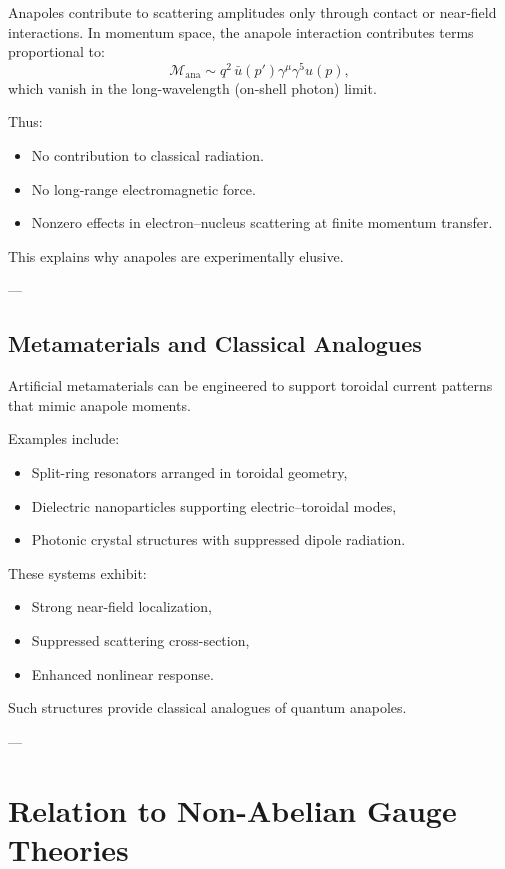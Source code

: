 \documentclass[11pt]{article}
\begin{document}
Anapoles contribute to scattering amplitudes only through contact or near-field interactions.  
In momentum space, the anapole interaction contributes terms proportional to:
\[
\mathcal{M}_{\text{ana}} \sim q^2 \, \bar{u}(p') \gamma^\mu \gamma^5 u(p),
\]
which vanish in the long-wavelength (on-shell photon) limit.

Thus:
\begin{itemize}
\item No contribution to classical radiation.
\item No long-range electromagnetic force.
\item Nonzero effects in electron–nucleus scattering at finite momentum transfer.
\end{itemize}

This explains why anapoles are experimentally elusive.

---

\subsection{Metamaterials and Classical Analogues}

Artificial metamaterials can be engineered to support toroidal current patterns that mimic anapole moments.

Examples include:
\begin{itemize}
\item Split-ring resonators arranged in toroidal geometry,
\item Dielectric nanoparticles supporting electric–toroidal modes,
\item Photonic crystal structures with suppressed dipole radiation.
\end{itemize}

These systems exhibit:
\begin{itemize}
\item Strong near-field localization,
\item Suppressed scattering cross-section,
\item Enhanced nonlinear response.
\end{itemize}

Such structures provide classical analogues of quantum anapoles.

---

\section{Relation to Non-Abelian Gauge Theories}
\end{document}
